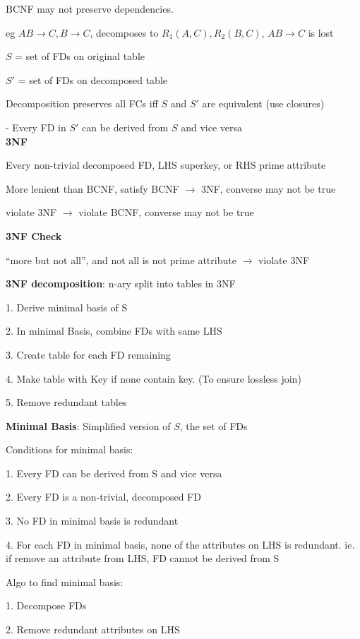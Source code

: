 \documentclass[10pt, a4paper]{article}
\newcommand{\blue}[1]{{\color{MidnightBlue}#1}}
\newcommand{\red}[1]{{\color{red}#1}}
\newcommand{\header}[1]{{\normalsize\textbf{#1}}}
\newcommand{\tab}[0]{\hspace*{2mm}}
\begin{document}
\begin{multicols*}{3}
		BCNF may not preserve dependencies.

		eg $AB \rightarrow C, B \rightarrow C$, decomposes to $R_1(A, C), R_2(B, C)$, $AB \rightarrow C$ is lost

		$S$ = set of FDs on original table

		$S'$ = set of FDs on decomposed table

		Decomposition \blue{preserves} all FCs iff $S$ and $S'$ are equivalent (use closures)

		\tab - Every FD in $S'$ can be derived from $S$ and vice versa\\ 

		\header{3NF}

		Every non-trivial decomposed FD, LHS superkey, or RHS \red{prime attribute}

		More lenient than BCNF, satisfy BCNF $\rightarrow$ 3NF, converse may not be true

		violate 3NF $\rightarrow$ violate BCNF, converse may not be true

		\textbf{3NF Check}

		``more but not all'', and not all is not prime attribute $\rightarrow$ violate 3NF

		\textbf{3NF decomposition}: n-ary split into tables in 3NF

		1. Derive \red{minimal basis} of S

		2. In minimal Basis, combine FDs with same LHS

		3. Create table for each FD remaining

		4. Make table with Key if none contain key. (To ensure lossless join)

		5. Remove redundant tables

		\textbf{Minimal Basis}: Simplified version of $S$, the set of FDs

		Conditions for minimal basis:

		1. Every FD can be derived from S and vice versa

		2. Every FD is a non-trivial, decomposed FD

		3. No FD in minimal basis is \red{redundant}
		
		4. For each FD in minimal basis, none of the attributes on LHS is \red{redundant}. ie. if remove an attribute from LHS, FD cannot be derived from S

		Algo to find minimal basis:

		1. Decompose FDs

		2. Remove redundant attributes on LHS


\end{multicols*}
\end{document}
